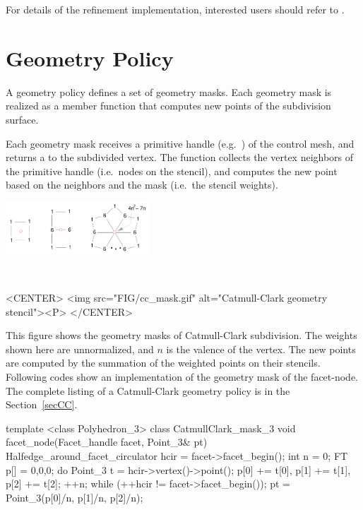 For details of the refinement implementation, 
interested users should refer to \cite{cgal:sp-mrbee-05}.

\section{Geometry Policy}
A geometry policy defines a set of geometry masks. 
Each geometry mask is realized as a member function
that computes new points of the subdivision surface. 

Each geometry mask receives a primitive handle 
(e.g.~) of the control mesh, 
and returns a  to the subdivided vertex. 
The function collects the vertex neighbors of the primitive handle 
(i.e.~nodes on the stencil), and computes the new point 
based on the neighbors and the mask (i.e.~the stencil weights).

\begin{ccTexOnly}
  \begin{center}
    \parbox{0.4\textwidth}{%
      \includegraphics[width=0.4\textwidth]{Subdivision_method_3/FIG/cc_mask}%
    } \\ \vspace{0.5cm}
  \end{center}
\end{ccTexOnly}
\begin{ccHtmlOnly}
  <CENTER>
     <img src="FIG/cc_mask.gif" alt="Catmull-Clark geometry stencil"><P>
  </CENTER>
\end{ccHtmlOnly}

This figure shows the geometry masks of
Catmull-Clark subdivision. The weights shown here are unnormalized, 
and $n$ is the valence of the vertex. The new points are 
computed by the summation of the weighted points on their stencils.
Following codes show an implementation of the geometry mask of 
the facet-node. The complete listing
of a Catmull-Clark geometry policy is in the Section~\ref{secCC}.

\begin{ccExampleCode}
template <class Polyhedron_3>
class CatmullClark_mask_3 {
  void facet_node(Facet_handle facet, Point_3& pt) {
    Halfedge_around_facet_circulator hcir = facet->facet_begin();
    int n = 0;
    FT p[] = {0,0,0};
    do {
      Point_3 t = hcir->vertex()->point();
      p[0] += t[0], p[1] += t[1], p[2] += t[2]; 
      ++n;
    } while (++hcir != facet->facet_begin());
    pt = Point_3(p[0]/n, p[1]/n, p[2]/n);
  }
}
\end{ccExampleCode}

